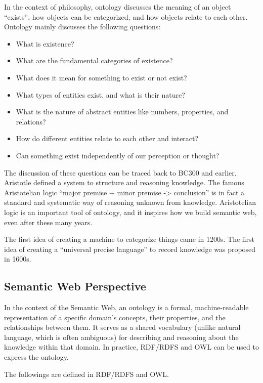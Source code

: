 In the context of philosophy, ontology discusses the meaning of an object “exists”, how objects can be categorized, and how objects relate to each other. Ontology mainly discusses the following questions:

\begin{itemize}
  \item What is existence?
  \item What are the fundamental categories of existence? 
  \item What does it mean for something to exist or not exist?
  \item What types of entities exist, and what is their nature?
  \item What is the nature of abstract entities like numbers, properties, and relations?
  \item How do different entities relate to each other and interact?
  \item Can something exist independently of our perception or thought?
\end{itemize}

The discussion of these questions can be traced back to BC300 and earlier. Aristotle defined a system to structure and reasoning knowledge. The famous Aristotelian logic “major premise + minor premise -> conclusion” is in fact a standard and systematic way of reasoning unknown from knowledge. Aristotelian logic is an important tool of ontology, and it inspires how we build semantic web, even after these many years.

The first idea of creating a machine to categorize things came in 1200s. The first idea of creating a “universal precise language” to record knowledge was proposed in 1600s.

\subsection{Semantic Web Perspective}

In the context of the Semantic Web, an ontology is a formal, machine-readable representation of a specific domain's concepts, their properties, and the relationships between them. It serves as a shared vocabulary (unlike natural language, which is often ambiguous) for describing and reasoning about the knowledge within that domain. In practice, RDF/RDFS and OWL can be used to express the ontology.

The followings are defined in RDF/RDFS and OWL.


